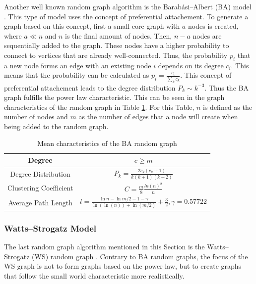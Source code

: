 Another well known random graph algorithm is the Barabási–Albert (BA) model 
\cite{barabasimodel}. 
This type of model uses the concept of preferential attachement.
To generate a graph based on this concept, first a small \glqq core\grqq{}
graph with $a$ nodes is created, where $a\ll n$ and $n$ is the final amount of nodes.
Then, $n-a$ nodes are sequentially added to the graph.
These nodes have a higher 
probability to connect to vertices that are already well-connected. 
Thus, the probability $p_i$ that a new node forms an edge with an
existing node $i$ depends on its degree $c_i$. This means that the
probability can be calculated as $p_i= \frac{c_i}{\sum_{k}c_k}$.
This concept of preferential attachement leads to the degree distribution
$P_k\sim k^{-3}$. Thus the BA graph 
fulfills the power law characteristic.
This can be seen in the graph characteristics of the random graph
in Table \ref{ba-model}. For this Table, $n$ is defined as the number
of nodes and $m$ as the number of edges that a node
will create when being added to the random graph.

\begin{table}[ht!]
    \centering
    \begin{tabular}{|c | c |} 
     \hline
     Degree & $c\geq m$ \\ 
     \hline
     Degree Distribution & 
     $P_k = \frac{2c_k(c_k+1)}{k(k+1)(k+2)}$ \\ 
     \hline
     Clustering Coefficient \cite{ba_cluster_coeff} & 
     $C=\frac{m}{8}\frac{ln(n)^2}{n}$ \\ 
     \hline
     Average Path Length \cite{averagepath}& 
     $l = \frac{\ln{n}- \ln{m/2} - 1 - \gamma}{\ln(\ln(n))+\ln{(m/2)}} + \frac{3}{2}, 
     \gamma=0.57722$ \\ 
     \hline
    \end{tabular}
    \caption{Mean characteristics of the BA random graph \cite{basicnetwork}}
    \label{ba-model}
\end{table}

\subsubsection{Watts–Strogatz Model}
The last random graph algorithm mentioned in this Section 
is the Watts–Strogatz (WS) random graph \cite{wattsmodel}.
Contrary to BA random graphs, the focus of the WS graph is not to 
form graphs based on the power law, but to create graphs
that follow the small world characteristic more realistically.

